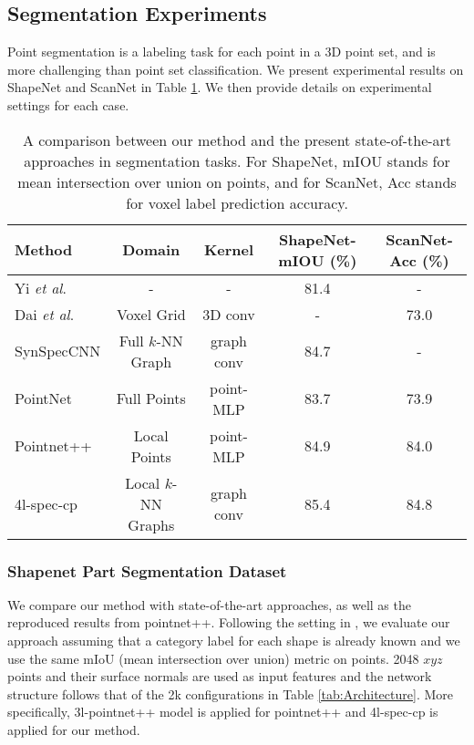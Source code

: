 \documentclass[runningheads]{llncs}
\newcommand{\etal}{\textit{et al}. }
\begin{document}
\subsection{Segmentation Experiments}
Point segmentation is a labeling task for each point in a 3D point set, and is more challenging than point set classification. We present experimental results on ShapeNet \cite{yi2016scalable} and ScanNet \cite{dai2017scannet} in Table \ref{tab:seg}.
We then provide details on experimental settings for each case.

\begin{table}[h]
    \centering
        \small
        \renewcommand{\arraystretch}{1.2}
 	\begin{tabular}[width=\linewidth]{l|c|c|c|c}
        \hline
        Method & Domain & Kernel  & ShapeNet-mIOU (\%) & ScanNet-Acc (\%)  \\
        \hline
Yi \etal \cite{yi2016scalable} & - & - & 81.4 & - \\
        Dai \etal \cite{dai2017scannet} & Voxel Grid & 3D conv & - & 73.0 \\
        SynSpecCNN \cite{yi2017syncspeccnn} & Full $k$-NN Graph & graph conv &  84.7 & - \\
        PointNet~\cite{qi2016pointnet} & Full Points & point-MLP & 83.7 & 73.9  \\ 
        \hline
        \hline
        Pointnet++ \cite{qi2017pointnet} & Local Points & point-MLP &  84.9 & 84.0 \\
        4l-spec-cp & Local $k$-NN Graphs & graph conv &  \cellcolor{pink}  85.4 & \cellcolor{pink} 84.8 \\
        \hline
    \end{tabular}
    \vspace{0.2cm}
    \caption{A comparison between our method and the present state-of-the-art approaches in segmentation tasks. For ShapeNet, mIOU stands for mean intersection over union on points, and for ScanNet, Acc stands for voxel label prediction accuracy.} 
    \label{tab:seg}
     \vspace{-.5cm}
 \end{table}


\subsubsection{Shapenet Part Segmentation Dataset}\label{sec:exp_shapenet}
We compare our method with state-of-the-art approaches, as well as the reproduced results from pointnet++. Following the setting in \cite{yi2016scalable}, we evaluate our approach assuming that a category label for each shape is already known and we use the same mIoU (mean intersection over union) metric on points. 2048 $xyz$ points and their surface normals are used as input features and the network structure follows that of the 2k configurations in Table \ref{tab:Architecture}. More specifically, 3l-pointnet++ model is applied for pointnet++ and 4l-spec-cp is applied for our method. 
\end{document}
